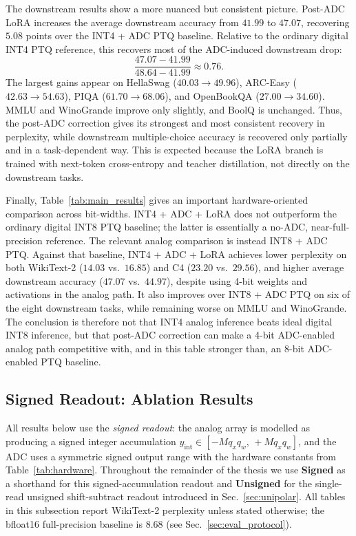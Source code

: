 \documentclass[a4paper,11pt,oneside]{article}
\theoremstyle{breakstyle}
\begin{document}
  The downstream results show a more nuanced but consistent picture.
  Post-ADC LoRA increases the average downstream accuracy from $41.99$
  to $47.07$, recovering $5.08$ points over the INT4 + ADC PTQ baseline.
  Relative to the ordinary digital INT4 PTQ reference, this recovers
  most of the ADC-induced downstream drop:
  \[
    \frac{47.07 - 41.99}{48.64 - 41.99}
    \approx 0.76 .
  \]
  The largest gains appear on HellaSwag ($40.03 \to 49.96$), ARC-Easy
  ($42.63 \to 54.63$), PIQA ($61.70 \to 68.06$), and OpenBookQA
  ($27.00 \to 34.60$).  MMLU and WinoGrande improve only slightly, and
  BoolQ is unchanged.  Thus, the post-ADC correction gives its strongest
  and most consistent recovery in perplexity, while downstream
  multiple-choice accuracy is recovered only partially and in a
  task-dependent way.  This is expected because the LoRA branch is
  trained with next-token cross-entropy and teacher distillation, not
  directly on the downstream tasks.

  Finally, Table~\ref{tab:main_results} gives an important
  hardware-oriented comparison across bit-widths.  INT4 + ADC + LoRA
  does not outperform the ordinary digital INT8 PTQ baseline; the latter
  is essentially a no-ADC, near-full-precision reference.  The relevant
  analog comparison is instead INT8 + ADC PTQ.  Against that baseline,
  INT4 + ADC + LoRA achieves lower perplexity on both WikiText-2
  ($14.03$ vs.\ $16.85$) and C4 ($23.20$ vs.\ $29.56$), and higher
  average downstream accuracy ($47.07$ vs.\ $44.97$), despite using
  4-bit weights and activations in the analog path.  It also improves
  over INT8 + ADC PTQ on six of the eight downstream tasks, while
  remaining worse on MMLU and WinoGrande.  The conclusion is therefore
  not that INT4 analog inference beats ideal digital INT8 inference, but
  that post-ADC correction can make a 4-bit ADC-enabled analog path
  competitive with, and in this table stronger than, an 8-bit
  ADC-enabled PTQ baseline.

  \subsection{Signed Readout: Ablation Results}
  \label{sec:signed_readout}

  All results below use the \emph{signed readout}: the analog array
  is modelled as producing a signed integer accumulation
  $y_{\mathrm{int}} \in [-M q_x q_w,\, +M q_x q_w]$, and the ADC uses
  a symmetric signed output range with the hardware constants from
  Table~\ref{tab:hardware}.  Throughout the remainder of the
  thesis we use \textbf{Signed} as a shorthand for this
  signed-accumulation readout and \textbf{Unsigned} for the
  single-read unsigned shift-subtract readout introduced in
  Sec.~\ref{sec:unipolar}.  All tables in this subsection report
  WikiText-2 perplexity unless stated otherwise; the bfloat16
  full-precision baseline is $8.68$ (see
  Sec.~\ref{sec:eval_protocol}).
\end{document}
